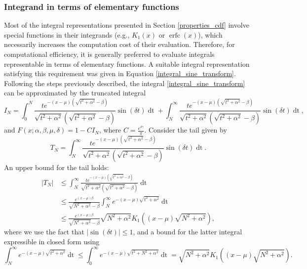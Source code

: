 \documentclass[10pt,a4paper,oneside]{article}
\DeclareMathOperator{\erfc}{erfc}
\numberwithin{equation}{section}
\begin{document}
\subsubsection{Integrand in terms of elementary functions}
Most of the integral representations presented in Section \ref{properties_cdf} involve special functions in their integrands (e.g., $K_1(x)$ or $\erfc(x)$), which necessarily increases the computation cost of their evaluation. Therefore, for computational efficiency, it is generally preferred to evaluate integrals representable in terms of elementary functions. A suitable integral representation satisfying this requirement was given in Equation \eqref{integral_sine_transform}. Following the steps previously described, the integral \eqref{integral_sine_transform} can be approximated by the truncated integral 
\begin{equation}\label{truncated_integral_sine_transform}
I_N = \int_0^N \frac{t e^{-(x-\mu)\left(\sqrt{t^2 + \alpha^2} - \beta\right)}}{\sqrt{t^2 + \alpha^2}\left(\sqrt{t^2 + \alpha^2} - \beta\right)}\sin(\delta t)\mathop{dt} + \int_N^{\infty} \frac{t e^{-(x-\mu)\left(\sqrt{t^2 + \alpha^2} - \beta\right)}}{\sqrt{t^2 + \alpha^2}\left(\sqrt{t^2 + \alpha^2} - \beta\right)}\sin(\delta t)\mathop{dt},
\end{equation}
and $F(x; \alpha, \beta, \mu, \delta) = 1 - C I_N$, where $C = \frac{e^{\delta \gamma}}{\pi}$. Consider the tail given by
\begin{equation}
T_N = \int_N^{\infty} \frac{t e^{-(x-\mu)\left(\sqrt{t^2 + \alpha^2} - \beta\right)}}{\sqrt{t^2 + \alpha^2}\left(\sqrt{t^2 + \alpha^2} - \beta\right)}\sin(\delta t)\mathop{dt}.
\end{equation}
An upper bound for the tail holds:
\begin{align*}
|T_N| &\le \int_N^{\infty} \frac{t e^{-(x-\mu)\left(\sqrt{t^2 + \alpha^2} - \beta\right)}}{\sqrt{t^2 + \alpha^2}\left(\sqrt{t^2 + \alpha^2} - \beta\right)}\mathop{dt}\\
&\le \frac{e^{(x-\mu)\beta}}{\sqrt{N^2 + \alpha^2} - \beta}\int_N^{\infty} e^{-(x-\mu)\sqrt{t^2 + \alpha^2}} \mathop{dt}\\
&\le \frac{e^{(x-\mu)\beta}}{\sqrt{N^2 + \alpha^2} - \beta} \sqrt{N^2 + \alpha^2} K_1((x-\mu)\sqrt{N^2 + \alpha^2}),
\end{align*}
where we use the fact that $|\sin(\delta t)| \le 1$, and a bound for the latter integral expressible in closed form using \cite[\S 3.461]{gradshteyn2007}
\begin{equation*}
\int_N^{\infty} e^{-(x-\mu)\sqrt{t^2 + \alpha^2}} \mathop{dt} \le \int_0^{\infty} e^{-(x-\mu)\sqrt{t^2 + N^2 + \alpha^2}} \mathop{dt} = \sqrt{N^2 + \alpha^2} K_1((x-\mu)\sqrt{N^2 + \alpha^2}).
\end{equation*}
\end{document}
